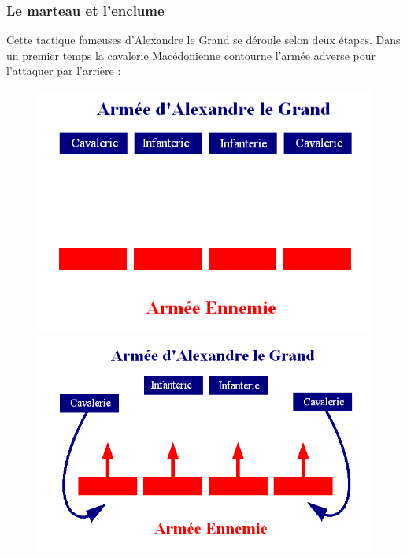 \documentclass{article}
\begin{document}
\subsubsection{Le marteau et l'enclume}
Cette tactique fameuses d'Alexandre le Grand se déroule selon deux étapes. Dans un premier temps la cavalerie Macédonienne contourne l'armée adverse pour l'attaquer par l'arrière :
\begin{center}
\begin{figure}[H]
\hfill
\begin{minipage}[H]{0.5\linewidth}
	\centering
	\includegraphics[width=\linewidth]{../ressources/marteau}
\end{minipage}
\hfill
\begin{minipage}[H]{0.45\linewidth}
	\centering
	\includegraphics[width=\linewidth]{../ressources/marteau2}
\end{minipage}

\end{figure}
\end{center}
\end{document}
